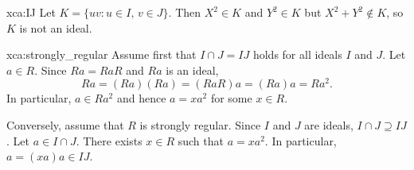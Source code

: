 \begin{sol}{xca:IJ}
    Let $K=\{uv:u\in I,\,v\in J\}$. Then
    $X^2\in K$ and $Y^2\in K$ but $X^2+Y^2\not\in K$, so $K$ is not an ideal.
\end{sol}

\begin{sol}{xca:strongly_regular}
    Assume first that $I\cap J=IJ$ holds for all ideals $I$ and $J$. 
    Let $a\in R$. Since $Ra=RaR$ and
    $Ra$ is an ideal, 
    \[
    Ra=(Ra)(Ra)=(RaR)a=(Ra)a=Ra^2.
    \]
    In particular, $a\in Ra^2$ and 
    hence $a=xa^2$ for some $x\in R$. 
    
    Conversely, assume that $R$ is strongly regular. Since $I$ and $J$ are
    ideals, $I\cap J\supseteq IJ$. 
    Let $a\in I\cap J$. There exists $x\in R$ such that
    $a=xa^2$. In particular, 
    $a=(xa)a\in IJ$.
\end{sol}

